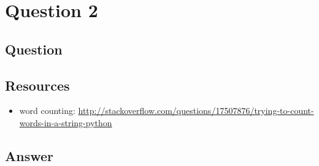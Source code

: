 \section{Question 2}

\subsection{Question}


\subsection{Resources}
\begin{itemize}
\item word counting: \url{http://stackoverflow.com/questions/17507876/trying-to-count-words-in-a-string-python}
\end{itemize}

\subsection{Answer}
